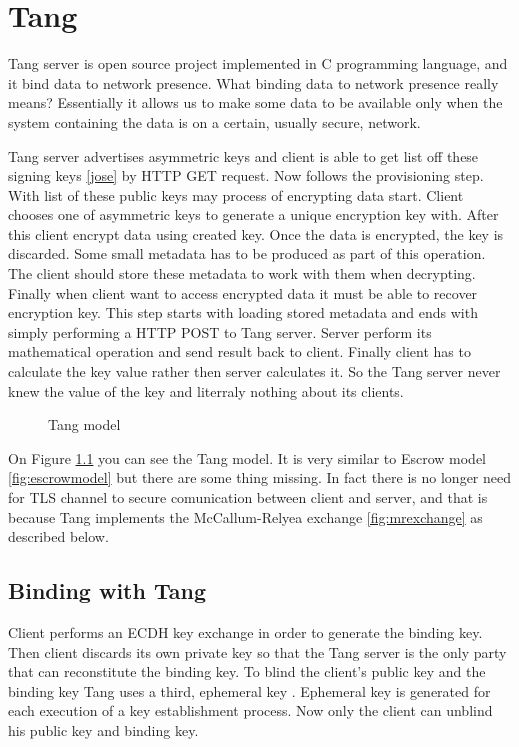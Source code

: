 \documentclass[../xdudla00-porting-Tang-to-Open-WRT.tex]{subfiles}
\begin{document}
\chapter{Tang}\label{tang}
Tang server is open source project implemented in C \cite{c} programming language, and it bind data to network presence.
What binding data to network presence really means?
Essentially it allows us to make some data to be available only when the system containing the data is on a certain, usually secure, network.

Tang server advertises asymmetric keys\cite{askey} and client is able to get list off these signing keys \ref{jose} by HTTP \cite{http} GET request.
Now follows the provisioning step. With list of these public keys may process of encrypting data start.
Client chooses one of asymmetric keys to generate a unique encryption key with.
After this client encrypt data using created key. Once the data is encrypted, the key is discarded.
Some small metadata has to be produced as part of this operation. The client should store these metadata to work with them when decrypting.
Finally when client want to access encrypted data it must be able to recover encryption key.
This step starts with loading stored metadata and ends with simply performing a HTTP\cite{http} POST to Tang server.
Server perform its mathematical operation and send result back to client.
Finally client has to calculate the key value rather then server calculates it.
So the Tang server never knew the value of the key and literraly nothing about its clients.

\begin{figure}[h]
    \centering
    \caption{Tang model}
    \label{fig:tangmodel}
\end{figure}

On Figure \ref{fig:tangmodel} you can see the Tang model.
It is very similar to Escrow model \ref{fig:escrowmodel} but there are some thing missing.
In fact there is no longer need for TLS channel to secure comunication between client and server,
 and that is because Tang implements the McCallum-Relyea exchange \ref{fig:mrexchange} as described below.

\section{Binding with Tang}

Client performs an ECDH \cite{ecdh} key exchange in order to generate the binding key.
Then client discards its own private key so that the Tang server is the only party that can reconstitute the binding key.
To blind the client's public key and the binding key Tang uses a third, ephemeral key \cite{epkey}.
Ephemeral key is generated for each execution of a key establishment process.
Now only the client can unblind his public key and binding key.
\end{document}
